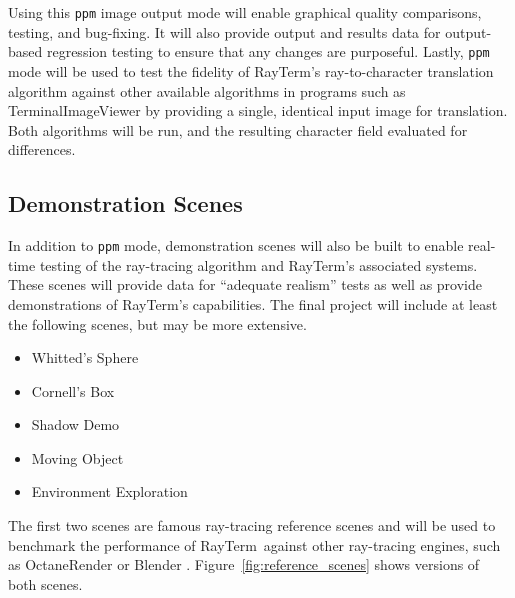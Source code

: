 \documentclass[11pt]{article}
\newcommand{\name}{{\sc RayTerm}}
\begin{document}
Using this \texttt{ppm} image output mode will enable graphical quality comparisons, testing, and bug-fixing.
It will also provide output and results data for output-based regression testing to ensure that any changes are purposeful.
Lastly, \texttt{ppm} mode will be used to test the fidelity of \name's ray-to-character translation algorithm against other available algorithms in programs such as TerminalImageViewer by providing a single, identical input image for translation.
Both algorithms will be run, and the resulting character field evaluated for differences.


\subsection{Demonstration Scenes}
\label{sec:evaluate:demo_scenes}

In addition to \texttt{ppm} mode, demonstration scenes will also be built to enable real-time testing of the ray-tracing algorithm and \name's associated systems.
These scenes will provide data for ``adequate realism'' tests as well as provide demonstrations of \name's capabilities.
The final project will include at least the following scenes, but may be more extensive.

\begin{itemize}
  \setlength\itemsep{-0.25em}
  \item Whitted's Sphere
  \item Cornell's Box
  \item Shadow Demo
  \item Moving Object
  \item Environment Exploration
\end{itemize}

The first two scenes are famous ray-tracing reference scenes and will be used to benchmark the performance of \name\ against other ray-tracing engines, such as OctaneRender \cite{octane} or Blender \cite{blender}.
Figure~\ref{fig:reference_scenes} shows versions of both scenes.
\end{document}
